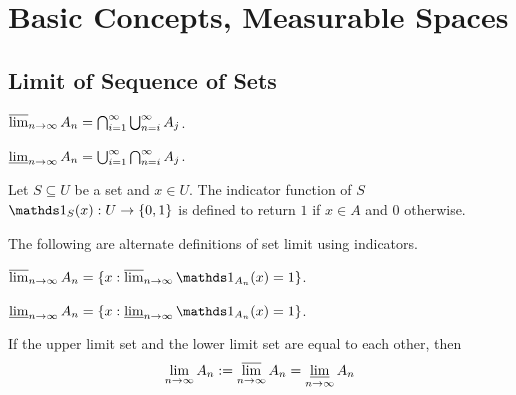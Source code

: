 \documentclass[class=book, crop=false]{standalone}
\begin{document}
    \section{Basic Concepts, Measurable Spaces}
        \subsection{Limit of Sequence of Sets}
        \begin{definition}
            $\varlimsup_{n \rightarrow \infty} A_n = \bigcap^{\infty}_{i = 1} \bigcup^{\infty}_{n = i} A_j$.
        \end{definition}
        
        \begin{definition}
            $\varliminf_{n \rightarrow \infty} A_n = \bigcup^{\infty}_{i = 1} \bigcap^{\infty}_{n = i} A_j$.
        \end{definition}
        
        \begin{definition}
            Let $S \subseteq U$ be a set and $x \in U$. The indicator function of $S$ $\indic_S(x) : U \rightarrow \{0, 1\}$ is defined to return $1$ if $x \in A$ and $0$ otherwise.
        \end{definition}
        
        \noindent The following are alternate definitions of set limit using indicators.
        \begin{theorem}
            $\varlimsup_{n \rightarrow \infty} A_n = \{x : \varlimsup_{n \rightarrow \infty} \indic_{A_n}(x) = 1\}$.
        \end{theorem}
        
        \begin{theorem}
            $\varliminf_{n \rightarrow \infty} A_n = \{x : \varliminf_{n \rightarrow \infty} \indic_{A_n}(x) = 1\}$.
        \end{theorem}

        \begin{theorem}[Existence of Limit for $\{A_n\}^{\infty}_{n = 1}$]
            If the upper limit set and the lower limit set are equal to each other, then
            \begin{equation*}
                \lim_{n \rightarrow \infty} A_n := \varlimsup_{n \rightarrow \infty} A_n = \varliminf_{n \rightarrow \infty} A_n
            \end{equation*}
        \end{theorem}
        
\end{document}
